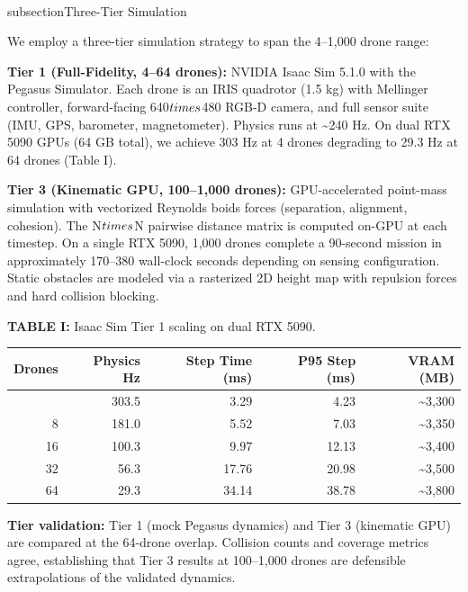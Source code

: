 \documentclass[conference]{IEEEtran}
\begin{document}
\\subsection{Three-Tier Simulation}\label{a.-three-tier-simulation}

We employ a three-tier simulation strategy to span the 4--1,000 drone
range:

\textbf{Tier 1 (Full-Fidelity, 4--64 drones):} NVIDIA Isaac Sim 5.1.0
with the Pegasus Simulator. Each drone is an IRIS quadrotor (1.5 kg)
with Mellinger controller, forward-facing 640$\\times$480 RGB-D camera, and full
sensor suite (IMU, GPS, barometer, magnetometer). Physics runs at
\textasciitilde240 Hz. On dual RTX 5090 GPUs (64 GB total), we achieve
303 Hz at 4 drones degrading to 29.3 Hz at 64 drones (Table I).

\textbf{Tier 3 (Kinematic GPU, 100--1,000 drones):} GPU-accelerated
point-mass simulation with vectorized Reynolds boids forces (separation,
alignment, cohesion). The N$\\times$N pairwise distance matrix is computed
on-GPU at each timestep. On a single RTX 5090, 1,000 drones complete a
90-second mission in approximately 170--380 wall-clock seconds depending
on sensing configuration. Static obstacles are modeled via a rasterized
2D height map with repulsion forces and hard collision blocking.

\textbf{TABLE I:} Isaac Sim Tier 1 scaling on dual RTX 5090.

{\def\LTcaptype{none} %
\begin{longtable}[]{@{}rrrrr@{}}
\toprule\noalign{}
Drones & Physics Hz & Step Time (ms) & P95 Step (ms) & VRAM (MB) \\
\midrule\noalign{}
\endhead
\bottomrule\noalign{}
\endlastfoot
4 & 303.5 & 3.29 & 4.23 & \textasciitilde3,300 \\
8 & 181.0 & 5.52 & 7.03 & \textasciitilde3,350 \\
16 & 100.3 & 9.97 & 12.13 & \textasciitilde3,400 \\
32 & 56.3 & 17.76 & 20.98 & \textasciitilde3,500 \\
64 & 29.3 & 34.14 & 38.78 & \textasciitilde3,800 \\
\end{longtable}
}

\textbf{Tier validation:} Tier 1 (mock Pegasus dynamics) and Tier 3
(kinematic GPU) are compared at the 64-drone overlap. Collision counts
and coverage metrics agree, establishing that Tier 3 results at
100--1,000 drones are defensible extrapolations of the validated
dynamics.
\end{document}
